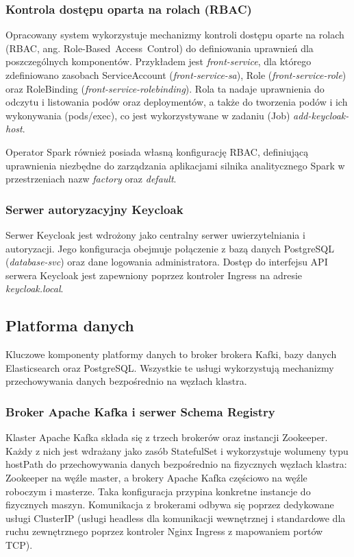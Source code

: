 \subsubsection{Kontrola dostępu oparta na rolach (RBAC)}
\label{subsubsec:RBAC}
Opracowany system wykorzystuje mechanizmy kontroli dostępu oparte na rolach (RBAC, ang. \mbox{Role-Based Access Control}) do definiowania uprawnień dla poszczególnych komponentów. Przykładem jest \textit{front-service}, dla którego zdefiniowano zasobach ServiceAccount (\textit{front-service-sa}), Role (\textit{front-service-role}) oraz RoleBinding (\textit{front-service-rolebinding}). Rola ta nadaje uprawnienia do odczytu i listowania podów oraz deploymentów, a także do tworzenia podów i ich wykonywania (pods/exec), co jest wykorzystywane w zadaniu (Job) \textit{add-keycloak-host}.

Operator Spark również posiada własną konfigurację RBAC, definiującą uprawnienia niezbędne do zarządzania aplikacjami silnika analitycznego Spark w przestrzeniach nazw \textit{factory} oraz \textit{default}.

\subsubsection{Serwer autoryzacyjny Keycloak}
Serwer Keycloak jest wdrożony jako centralny serwer uwierzytelniania i autoryzacji. Jego konfiguracja obejmuje połączenie z bazą danych PostgreSQL (\textit{database-svc}) oraz dane logowania administratora. Dostęp do interfejsu API serwera Keycloak jest zapewniony poprzez kontroler Ingress na adresie \textit{keycloak.local}.

\subsection{Platforma danych}

Kluczowe komponenty platformy danych to broker brokera Kafki, bazy danych Elasticsearch oraz PostgreSQL. Wszystkie te usługi wykorzystują mechanizmy przechowywania danych bezpośrednio na węzłach klastra.

\subsubsection{Broker Apache Kafka i serwer Schema Registry}
Klaster Apache Kafka składa się z trzech brokerów oraz instancji Zookeeper. Każdy z nich jest wdrażany jako zasób StatefulSet i wykorzystuje wolumeny typu hostPath do przechowywania danych bezpośrednio na fizycznych węzłach klastra: Zookeeper na węźle master, a brokery Apache Kafka częściowo na węźle roboczym i masterze. Taka konfiguracja przypina konkretne instancje do fizycznych maszyn. Komunikacja z brokerami odbywa się poprzez dedykowane usługi \mbox{ClusterIP} (usługi headless dla komunikacji wewnętrznej i standardowe dla ruchu zewnętrznego poprzez kontroler Nginx Ingress z mapowaniem portów TCP).

